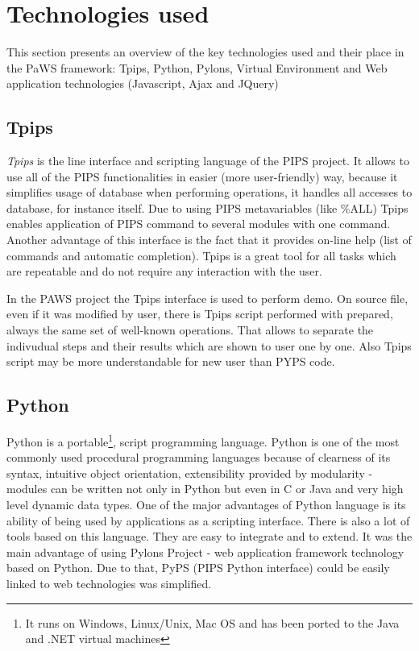 \section{Technologies used}

This section presents an overview of the key technologies used and their place in the PaWS framework: Tpips, Python, Pylons, Virtual Environment and Web application technologies (Javascript, Ajax and JQuery)

\subsection{Tpips}
\label{tpips_interface}
\emph{Tpips} is the line interface and scripting language of the PIPS project. It allows to use all of the PIPS functionalities in easier (more user-friendly) way, because it simplifies usage of database when performing operations, it handles all accesses to database, for instance itself.
Due to using PIPS metavariables (like \%ALL) Tpips enables application of PIPS command to several modules with one command. Another advantage of this interface is the fact that it provides on-line help (list of commands and automatic completion).
Tpips is a great tool for all tasks which are repeatable and do not require any interaction with the user.

In the PAWS project the Tpips interface is used to perform demo. On source file, even if it was modified by user, there is Tpips script performed with prepared, always the same set of well-known operations. That allows to separate the indivudual steps and their results which are shown to user one by one. Also Tpips script may be more understandable for new user than PYPS code.

\subsection{Python}
\label{python_description}
Python is a portable\footnote{It runs on Windows, Linux/Unix, Mac OS and has been ported to the Java and .NET virtual machines}, script programming language. Python is one of the most commonly used procedural programming languages because of clearness of its syntax, intuitive object orientation, extensibility provided by modularity - modules can be written not only in Python but even in C or Java and very high level dynamic data types. One of the major advantages of Python language is its ability of being used by applications as a scripting interface.
There is also a lot of tools based on this language. They are easy to integrate and to extend. It was the main advantage of using Pylons Project\cite{pylons} - web application framework technology based on Python. Due to that, PyPS (PIPS Python interface) could be easily linked to web technologies was simplified.

